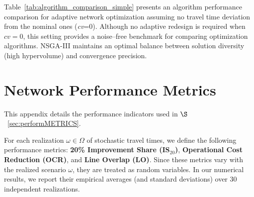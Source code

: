 \documentclass[a4paper,fleqn]{cas-sc}
\begin{document}
Table~\ref{tab:algorithm_comparison_simple} presents an algorithm performance comparison for adaptive network optimization assuming no travel time deviation from the nominal ones (\textit{cv}=0).
Although no adaptive redesign is required when $cv=0$, this setting provides a noise–free benchmark for comparing optimization algorithms.
NSGA-III maintains an optimal balance between solution diversity (high hypervolume) and convergence precision.
%


\section{Network Performance Metrics}\label{A.PerformanceMetrics}

This appendix details the performance indicators used in $\S$~\ref{sec:performMETRICS}.

For each realization $\omega \in \Omega$ of stochastic travel times, we define the following performance metrics: \textbf{20\% Improvement Share (IS$_{20}$)}, \textbf{Operational Cost Reduction (OCR)}, and \textbf{Line Overlap (LO)}. Since these metrics vary with the realized scenario $\omega$, they are treated as random variables. In our numerical results, we report their empirical averages (and standard deviations) over 30 independent realizations.
\end{document}
